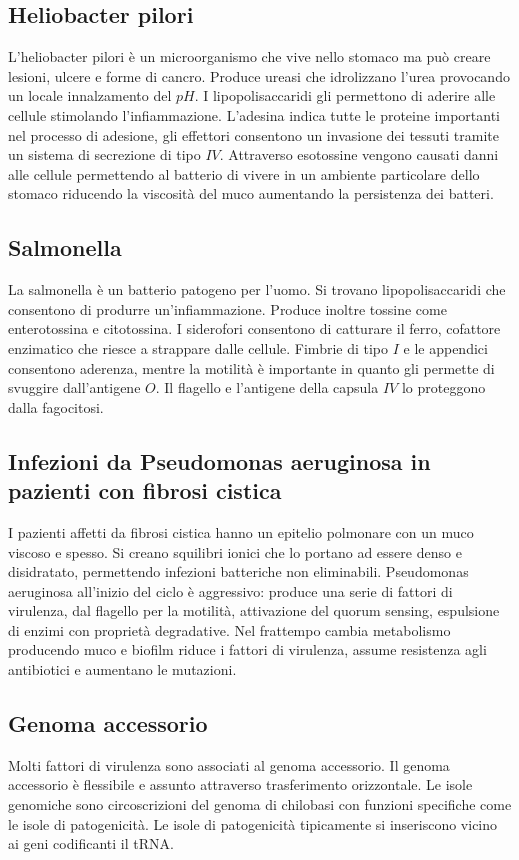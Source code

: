 	\subsection{Heliobacter pilori}
	L'heliobacter pilori \`e  un microorganismo che vive nello stomaco ma pu\`o creare lesioni, ulcere e forme di cancro.
	Produce ureasi che idrolizzano l'urea provocando un locale innalzamento del $pH$.
	I lipopolisaccaridi gli permettono di aderire alle cellule stimolando l'infiammazione.
	L'adesina indica tutte le proteine importanti nel processo di adesione, gli effettori consentono un invasione dei tessuti tramite un sistema di secrezione di tipo $IV$.
	Attraverso esotossine vengono causati danni alle cellule permettendo al batterio di vivere in un ambiente particolare dello stomaco riducendo la viscosit\`a del muco aumentando la persistenza dei batteri.

	\subsection{Salmonella}
	La salmonella \`e un batterio patogeno per l'uomo.
	Si trovano lipopolisaccaridi che consentono di produrre un'infiammazione.
	Produce inoltre tossine come enterotossina e citotossina.
	I siderofori consentono di catturare il ferro, cofattore enzimatico che riesce a strappare dalle cellule.
	Fimbrie di tipo $I$ e le appendici consentono aderenza, mentre la motilit\`a \`e importante in quanto gli permette di svuggire dall'antigene $O$.
	Il flagello e l'antigene della capsula $IV$ lo proteggono dalla fagocitosi.

	\subsection{Infezioni da Pseudomonas aeruginosa in pazienti con fibrosi cistica}
	I pazienti affetti da fibrosi cistica hanno un epitelio polmonare con un muco viscoso e spesso.
	Si creano squilibri ionici che lo portano ad essere denso e disidratato, permettendo infezioni batteriche non eliminabili.
	Pseudomonas aeruginosa all'inizio del ciclo \`e aggressivo: produce una serie di fattori di virulenza, dal flagello per la motilit\`a, attivazione del quorum sensing, espulsione di enzimi con propriet\`a degradative.
	Nel frattempo cambia metabolismo producendo muco e biofilm riduce i fattori di virulenza, assume resistenza agli antibiotici e aumentano le mutazioni.

	\subsection{Genoma accessorio}
	Molti fattori di virulenza sono associati al genoma accessorio.
	Il genoma accessorio \`e flessibile e assunto attraverso trasferimento orizzontale.
	Le isole genomiche sono circoscrizioni del genoma di chilobasi con funzioni specifiche come le isole di patogenicit\`a.
	Le isole di patogenicit\`a tipicamente si inseriscono vicino ai geni codificanti il tRNA.

